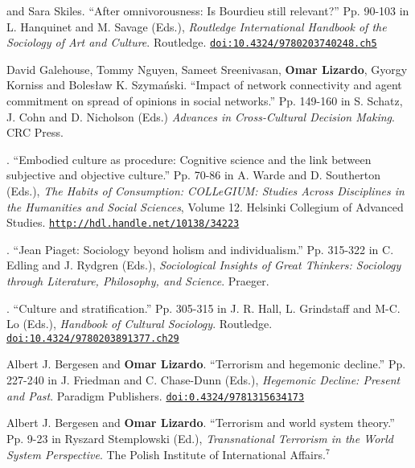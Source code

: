 
 and Sara Skiles. ``After omnivorousness: Is Bourdieu still relevant?''  Pp. 90-103 in L. Hanquinet and M. Savage (Eds.), {\em Routledge International Handbook of the Sociology of Art and Culture}. Routledge. \href{https://www.routledgehandbooks.com/doi/10.4324/9780203740248.ch5}{\nolinkurl{doi:10.4324/9780203740248.ch5}}

\ind David Galehouse, Tommy Nguyen, Sameet Sreenivasan, {\bf Omar Lizardo}, Gyorgy Korniss and Boles\l{}aw K. Szyma\'{n}ski. ``Impact of network connectivity and agent commitment on spread of opinions in social networks.'' Pp. 149-160 in S. Schatz, J. Cohn and D. Nicholson (Eds.) {\em Advances in Cross-Cultural Decision Making}. CRC Press. 

. ``Embodied culture as procedure: Cognitive science and the link between subjective and objective culture.'' Pp. 70-86 in A. Warde and D. Southerton (Eds.), {\em The Habits of Consumption: COLLeGIUM: Studies Across Disciplines in the Humanities and Social Sciences}, Volume 12. Helsinki Collegium of Advanced Studies. \href{http://hdl.handle.net/10138/34223}{\nolinkurl{http://hdl.handle.net/10138/34223}}

. ``Jean Piaget: Sociology beyond holism and individualism.'' Pp. 315-322 in C. Edling and J. Rydgren (Eds.), {\em Sociological Insights of Great Thinkers: Sociology through Literature, Philosophy, and Science}. Praeger. 

. ``Culture and stratification.''  Pp. 305-315 in J. R. Hall, L. Grindstaff and M-C. Lo (Eds.), {\em Handbook of Cultural Sociology}. Routledge. \href{https://www.routledgehandbooks.com/doi/10.4324/9780203891377.ch29}{\nolinkurl{doi:10.4324/9780203891377.ch29}}

\ind Albert J. Bergesen and {\bf Omar Lizardo}. ``Terrorism and hegemonic decline.'' Pp. 227-240 in J. Friedman and C. Chase-Dunn (Eds.), {\em Hegemonic Decline: Present and Past}. Paradigm Publishers. \href{https://doi.org/10.4324/9781315634173}{\nolinkurl{doi:0.4324/9781315634173}} 

\ind Albert J. Bergesen and {\bf Omar Lizardo}. ``Terrorism and world system theory.'' Pp. 9-23 in Ryszard Stemplowski (Ed.), {\emph{Transnational Terrorism in the World System Perspective}}. The Polish Institute of International Affairs.\textcolor{uclablue}{$^{7}$}